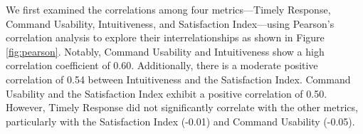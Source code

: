 \documentclass[11pt]{article}
\begin{document}

We first examined the correlations among four metrics—Timely Response, Command Usability, Intuitiveness, and Satisfaction Index—using Pearson’s correlation analysis to explore their interrelationships as shown in Figure \ref{fig:pearson}. Notably, Command Usability and Intuitiveness show a high correlation coefficient of 0.60. Additionally, there is a moderate positive correlation of 0.54 between Intuitiveness and the Satisfaction Index. Command Usability and the Satisfaction Index exhibit a positive correlation of 0.50. However, Timely Response did not significantly correlate with the other metrics, particularly with the Satisfaction Index (-0.01) and Command Usability (-0.05).



\end{document}

